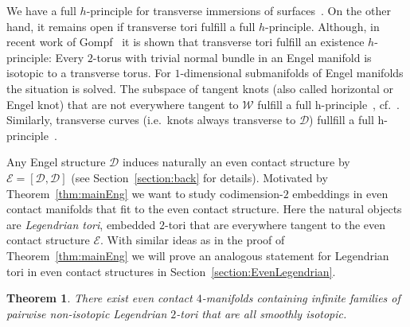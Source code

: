 \documentclass{amsart} %
\newcommand{\D}{\mathcal{D}}
\newcommand{\E}{\mathcal{E}}
\newcommand{\W}{\mathcal{W}}
\theoremstyle{thm}
\newtheorem{thm}[Theorem]{Theorem}
\theoremstyle{definition}
\begin{document}

We have a full $h$-principle for transverse immersions of surfaces~\cite{PP19}. On the other hand, it remains open if transverse tori fulfill a full $h$-principle. Although, in recent work of Gompf~\cite{Go22} it is shown that transverse tori fulfill an existence $h$-principle: Every $2$-torus with trivial normal bundle in an Engel manifold is isotopic to a transverse torus.
For $1$-dimensional submanifolds of Engel manifolds the situation is solved. 
The subspace of tangent knots (also called horizontal or Engel knot) that are not everywhere tangent to $\W$ fulfill a full h-principle~\cite{CP18}, cf.~\cite{Ad07,Ge08a,FMP20}. Similarly, transverse curves (i.e.\ knots always transverse to $\D$) fullfill a full h-principle~\cite[Theorem~4.6.2]{EM02}.

Any Engel structure $\D$ induces naturally an even contact structure by $\E=[\D,\D]$ (see Section~\ref{section:back} for details). Motivated by Theorem~\ref{thm:mainEng} we want to study codimension-$2$ embeddings in even contact manifolds that fit to the even contact structure. Here the natural objects are \textit{Legendrian tori}, embedded $2$-tori that are everywhere tangent to the even contact structure $\E$. With similar ideas as in the proof of Theorem~\ref{thm:mainEng} we will prove an analogous statement for Legendrian tori in even contact structures in Section~\ref{section:EvenLegendrian}.

\begin{thm}\label{thm:mainEven}
	There exist even contact $4$-mani\-folds containing infinite families of pairwise non-isotopic Legendrian $2$-tori that are all smoothly isotopic.
\end{thm}

\end{document}
